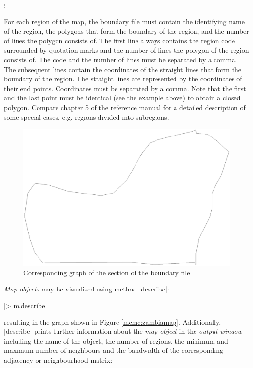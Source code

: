 \hspace{1cm} $\vdots$

\normalsize

\vspace{0.3cm}

For each region of the map, the boundary file must contain the identifying name of the region, the polygons that form the
boundary of the region, and the number of lines the polygon consists of. The first line always contains the region code
surrounded by quotation marks and the number of lines the polygon of the region consists of. The code and the number of lines
must be separated by a comma. The subsequent lines contain the coordinates of the straight lines that form the boundary of the
region. The straight lines are represented by the coordinates of their end points. Coordinates must be separated by a comma.
Note that the first and the last point must be identical (see the example above) to obtain a closed polygon. Compare chapter 5
of the reference manual for a detailed description of some special cases, e.g. regions divided into subregions.

\begin{figure}[h]
\centering
\includegraphics [scale=0.3]{grafiken/zambia52.ps}
\caption{\label{mcmc:zambia52} Corresponding graph of the section of
the boundary file}
\end{figure}

{\it Map objects} may be visualised using method |describe|:

|> m.describe|

resulting in the graph shown in Figure \ref{mcmc:zambiamap}. Additionally, |describe| prints further information about the {\it
map object} in the {\it output window} including the name of the object, the number of regions, the minimum and maximum number
of neighbours and the bandwidth of the corresponding adjacency or neighbourhood matrix:

